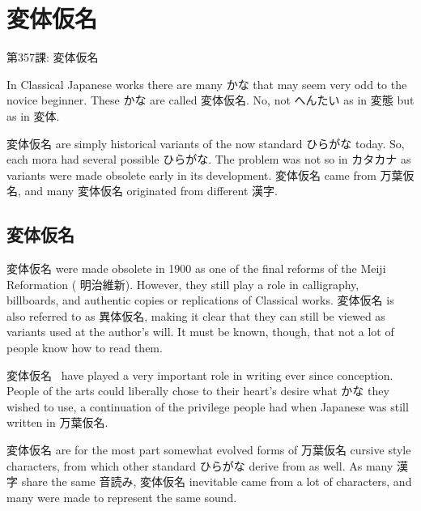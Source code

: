     
\chapter{変体仮名}

\begin{center}
\begin{Large}
第357課: 変体仮名 
\end{Large}
\end{center}
 
\par{  In Classical Japanese works there are many かな that may seem very odd to the novice beginner. These かな are called 変体仮名. No, not へんたい as in 変態 but as in 変体. }

\par{変体仮名 are simply historical variants of the now standard ひらがな today. So, each mora had several possible ひらがな. The problem was not so in カタカナ as variants were made obsolete early in its development. 変体仮名 came from 万葉仮名, and many 変体仮名 originated from different 漢字. }
      
\section{変体仮名}
 
\par{ 変体仮名 were made obsolete in 1900 as one of the final reforms of  the  Meiji Reformation ( 明治維新).  However,  they still play a role in calligraphy, billboards, and authentic copies or replications of Classical works. 変体仮名 is also referred  to as 異体仮名, making it clear that they can  still be viewed  as variants used at the author's will. It must be known, though, that not a lot of people know how to read them. }

\par{変体仮名  have played a very important role in writing ever since conception.  People of the arts could liberally chose to their heart's desire what かな they wished to use, a continuation of the privilege people had  when Japanese was still written in 万葉仮名. }

\par{変体仮名 are for the most  part somewhat evolved forms of 万葉仮名 cursive  style characters, from which other standard ひらがな derive from as  well. As many 漢字 share the same 音読み, 変体仮名 inevitable came from a lot of characters, and many were made to represent  the same sound. }

